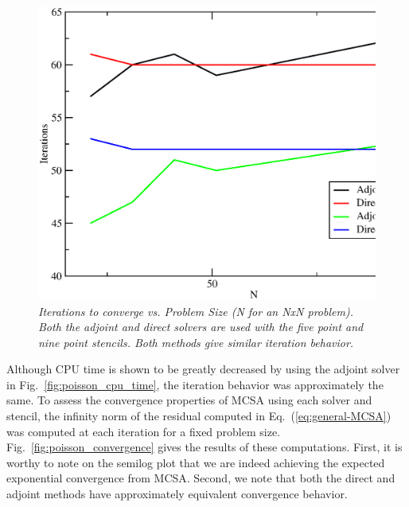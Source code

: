 \documentclass[preprint,12pt]{elsarticle}
\begin{document}
\begin{figure}[htbp!]
  \centering
  \includegraphics[width=5in,clip]{Adjoint_Direct_Iterations.eps}
  \caption{\sl Iterations to converge vs. Problem Size (N for an NxN
    problem). Both the adjoint and direct solvers are used with the
    five point and nine point stencils. Both methods give similar
    iteration behavior.}
  \label{fig:poisson_iterations}
\end{figure}

Although CPU time is shown to be greatly decreased by using the
adjoint solver in Fig.~\ref{fig:poisson_cpu_time}, the iteration
behavior was approximately the same. To assess the convergence
properties of MCSA using each solver and stencil, the infinity norm of
the residual computed in Eq.~(\ref{eq:general-MCSA}) was computed at
each iteration for a fixed problem
size. Fig.~\ref{fig:poisson_convergence} gives the results of these
computations. First, it is worthy to note on the semilog plot that we
are indeed achieving the expected exponential convergence from
MCSA. Second, we note that both the direct and adjoint methods have
approximately equivalent convergence behavior. 
\end{document}
